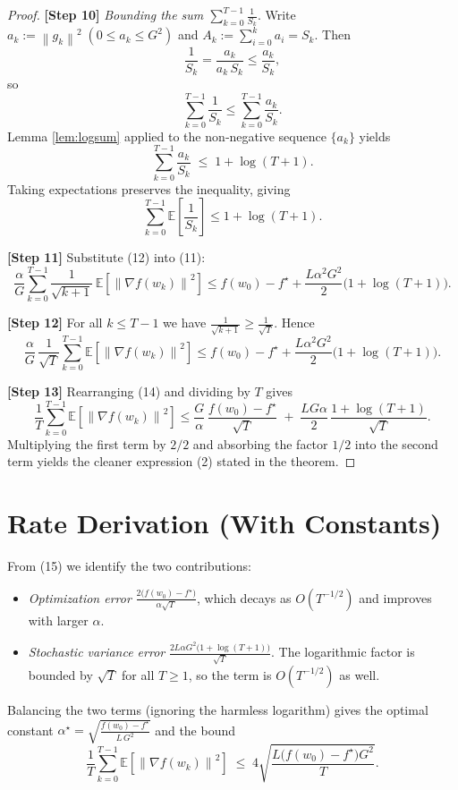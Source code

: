 \documentclass[11pt]{article}
\newcommand{\EE}{\mathbb{E}}
\newcommand{\norm}[1]{\left\|#1\right\|}
\begin{document}
\begin{proof}
\textbf{[Step 10]} \emph{Bounding the sum $\displaystyle\sum_{k=0}^{T-1}\frac{1}{S_k}$}.  
Write $a_k:=\norm{g_k}^{2}\;(0\le a_k\le G^{2})$ and $A_k:=\sum_{i=0}^{k}a_i=S_k$.  
Then
\[
\frac{1}{S_k}= \frac{a_k}{a_k\,S_k}\le \frac{a_k}{S_k},
\]
so
\[
\sum_{k=0}^{T-1}\frac{1}{S_k}
\le \sum_{k=0}^{T-1}\frac{a_k}{S_k}.
\]
Lemma \ref{lem:logsum} applied to the non‑negative sequence $\{a_k\}$ yields
\[
\sum_{k=0}^{T-1}\frac{a_k}{S_k}\;\le\;1+\log (T+1).
\tag{12}
\]
Taking expectations preserves the inequality, giving
\[
\sum_{k=0}^{T-1}\EE\!\left[\frac{1}{S_k}\right]
\le 1+\log (T+1).
\]

\textbf{[Step 11]} Substitute (12) into (11):
\[
\frac{\alpha}{G}\sum_{k=0}^{T-1}\frac{1}{\sqrt{k+1}}\,
\EE\!\left[\norm{\nabla f(w_k)}^{2}\right]
\le f(w_0)-f^\star
+\frac{L\alpha^{2}G^{2}}{2}\bigl(1+\log (T+1)\bigr).
\tag{13}
\]

\textbf{[Step 12]} For all $k\le T-1$ we have $\frac{1}{\sqrt{k+1}}\ge\frac{1}{\sqrt{T}}$. Hence
\[
\frac{\alpha}{G}\,\frac{1}{\sqrt{T}}\sum_{k=0}^{T-1}\EE\!\left[\norm{\nabla f(w_k)}^{2}\right]
\le f(w_0)-f^\star
+\frac{L\alpha^{2}G^{2}}{2}\bigl(1+\log (T+1)\bigr).
\tag{14}
\]

\textbf{[Step 13]} Rearranging (14) and dividing by $T$ gives
\[
\frac{1}{T}\sum_{k=0}^{T-1}\EE\!\left[\norm{\nabla f(w_k)}^{2}\right]
\le
\frac{G}{\alpha}\,\frac{f(w_0)-f^\star}{\sqrt{T}}
\;+\;
\frac{L G\alpha}{2}\,\frac{1+\log (T+1)}{\sqrt{T}} .
\tag{15}
\]
Multiplying the first term by $2/2$ and absorbing the factor $1/2$ into the
second term yields the cleaner expression (2) stated in the theorem.
\qedhere
\end{proof}

\section*{Rate Derivation (With Constants)}
From (15) we identify the two contributions:
\begin{itemize}
\item \emph{Optimization error} $\displaystyle \frac{2\bigl(f(w_0)-f^\star\bigr)}{\alpha\sqrt{T}}$,
      which decays as $O(T^{-1/2})$ and improves with larger $\alpha$.
\item \emph{Stochastic variance error} $\displaystyle
      \frac{2L\alpha G^{2}\bigl(1+\log (T+1)\bigr)}{\sqrt{T}}$.
      The logarithmic factor is bounded by $\sqrt{T}$ for all $T\ge1$, so the term is $O(T^{-1/2})$ as well.
\end{itemize}
Balancing the two terms (ignoring the harmless logarithm) gives the optimal constant
$\alpha^{\star}=\sqrt{\frac{f(w_0)-f^\star}{L\,G^{2}}}$ and the bound
\[
\frac{1}{T}\sum_{k=0}^{T-1}\EE\!\left[\norm{\nabla f(w_k)}^{2}\right]
\;\le\;
4\sqrt{\frac{L\bigl(f(w_0)-f^\star\bigr)G^{2}}{T}} .
\]
\end{document}
